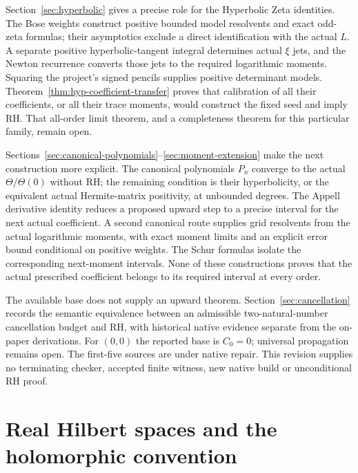\documentclass[11pt,a4paper]{article}
\numberwithin{equation}{section}
\theoremstyle{definition}
\theoremstyle{remark}
\begin{document}
Section~\ref{sec:hyperbolic} gives a precise role for the Hyperbolic
Zeta identities. The Bose weights construct positive bounded model
resolvents and exact odd-zeta formulas; their asymptotics exclude a
direct identification with the actual $L$. A separate positive
hyperbolic-tangent integral determines actual $\xi$ jets, and the
Newton recurrence converts those jets to the required logarithmic
moments. Squaring the project's signed pencils supplies positive
determinant models. Theorem~\ref{thm:hyp-coefficient-transfer} proves
that calibration of all their coefficients, or all their trace moments,
would construct the fixed seed and imply RH. That all-order limit
theorem, and a completeness theorem for this particular family,
remain open.



Sections~\ref{sec:canonical-polynomials}--\ref{sec:moment-extension}
make the next construction more explicit. The canonical polynomials
$P_n$ converge to the actual $\Theta/\Theta(0)$ without RH; the
remaining condition is their hyperbolicity, or the equivalent actual
Hermite-matrix positivity, at unbounded degrees. The Appell derivative
identity reduces a proposed upward step to a precise interval for the
next actual coefficient. A second canonical route supplies grid
resolvents from the actual logarithmic moments, with exact moment
limits and an explicit error bound conditional on positive weights.
The Schur formulas isolate the corresponding next-moment intervals.
None of these constructions proves that the actual prescribed
coefficient belongs to its required interval at every order.

The available base does not supply an upward theorem.
Section~\ref{sec:cancellation} records the semantic equivalence between an
admissible two-natural-number cancellation budget and RH, with historical
native evidence separate from the on-paper derivations. For $(0,0)$ the
reported base is $C_0=0$; universal propagation remains open. The first-five
sources are under native repair. This revision supplies no terminating
checker, accepted finite witness, new native build or unconditional RH proof.

\appendix
\section[Real Hilbert spaces]{Real Hilbert spaces and the holomorphic convention}\label{app:real}
\end{document}

